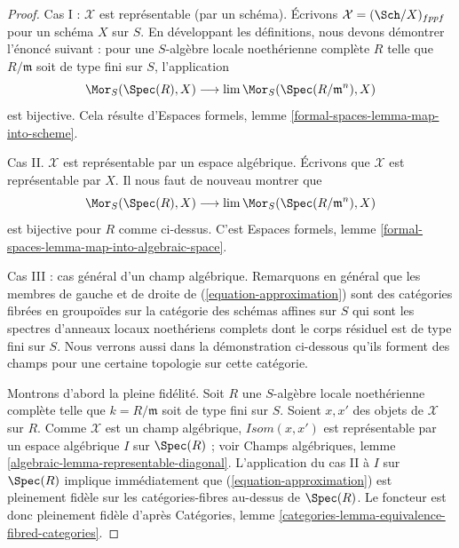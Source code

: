 \begin{proof}
Cas I : $\mathcal{X}$ est représentable (par un schéma). Écrivons
$\mathcal{X} = (\Sch/X)_{fppf}$ pour un schéma $X$ sur $S$.
En développant les définitions, nous devons démontrer l'énoncé suivant : pour
une $S$-algèbre locale noethérienne complète $R$ telle que
$R/\mathfrak m$ soit de type fini sur $S$, l'application
$$
\Mor_S(\Spec(R), X) \longrightarrow \lim \Mor_S(\Spec(R/\mathfrak m^n), X)
$$
est bijective. Cela résulte d'Espaces formels, lemme
\ref{formal-spaces-lemma-map-into-scheme}.

\medskip\noindent
Cas II. $\mathcal{X}$ est représentable par un espace algébrique. Écrivons
que $\mathcal{X}$ est représentable par $X$. Il nous faut de nouveau montrer
que
$$
\Mor_S(\Spec(R), X) \longrightarrow \lim \Mor_S(\Spec(R/\mathfrak m^n), X)
$$
est bijective pour $R$ comme ci-dessus. C'est Espaces formels, lemme
\ref{formal-spaces-lemma-map-into-algebraic-space}.

\medskip\noindent
Cas III : cas général d'un champ algébrique. Remarquons en général que les
membres de gauche et de droite de (\ref{equation-approximation}) sont des
catégories fibrées en groupoïdes sur la catégorie des schémas affines sur
$S$ qui sont les spectres d'anneaux locaux noethériens complets dont le corps
résiduel est de type fini sur $S$. Nous verrons aussi dans la démonstration
ci-dessous qu'ils forment des champs pour une certaine topologie sur cette
catégorie.

\medskip\noindent
Montrons d'abord la pleine fidélité. Soit $R$ une $S$-algèbre locale
noethérienne complète telle que $k = R/\mathfrak m$ soit de type fini sur
$S$. Soient $x, x'$ des objets de $\mathcal{X}$ sur $R$. Comme
$\mathcal{X}$ est un champ algébrique, $\mathit{Isom}(x, x')$ est
représentable par un espace algébrique $I$ sur $\Spec(R)$ ; voir Champs
algébriques, lemme \ref{algebraic-lemma-representable-diagonal}.
L'application du cas II à $I$ sur $\Spec(R)$ implique immédiatement que
(\ref{equation-approximation}) est pleinement fidèle sur les catégories-fibres
au-dessus de $\Spec(R)$. Le foncteur est donc pleinement fidèle d'après
Catégories, lemme \ref{categories-lemma-equivalence-fibred-categories}.


\end{proof}
